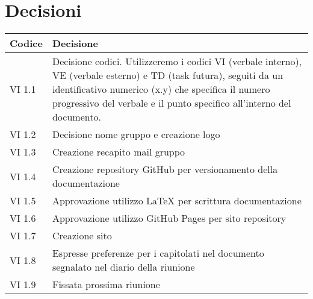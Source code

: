 \section{Decisioni}

	\begin{table}[htbp]
		\begin{tabular}{|p{}|p{}|}
			\hline
			\rowcolor[gray]{0.9}
			Codice & Decisione \\
			\hline
			VI 1.1 & Decisione codici. Utilizzeremo i codici VI (verbale interno), VE (verbale esterno) e TD (task futura), seguiti da un identificativo numerico (x.y) che specifica il numero progressivo del verbale e il punto specifico all'interno del documento. \\
			\hline
			VI 1.2	& Decisione nome gruppo e creazione logo \\
			\hline
			VI 1.3 & Creazione recapito mail gruppo \\
			\hline
			VI 1.4 & Creazione repository GitHub per versionamento della documentazione \\
			\hline
			VI 1.5	& Approvazione utilizzo LaTeX per scrittura documentazione \\
			\hline
			VI 1.6 & Approvazione utilizzo GitHub Pages per sito repository \\
			\hline
			VI 1.7 & Creazione sito \\
			\hline
			VI 1.8 & Espresse preferenze per i capitolati nel documento segnalato nel diario della riunione \\
			\hline
			VI 1.9 & Fissata prossima riunione \\
			\hline
		\end{tabular}
	\end{table}